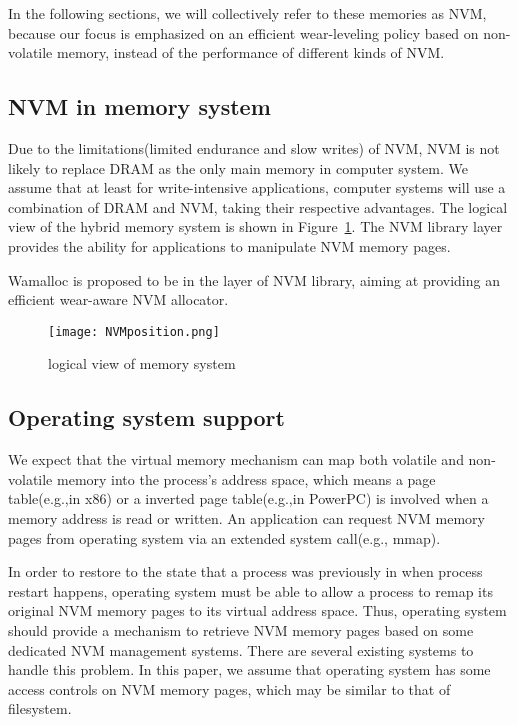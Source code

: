 \documentclass[10pt, conference, compsocconf]{IEEEtran}
\begin{document}
In the following sections, we will collectively refer to these memories as NVM, 
because our focus is emphasized on an efficient wear-leveling policy based on non-volatile memory,
instead of the performance of different kinds of NVM.

\subsection{NVM in memory system}

Due to the limitations(limited endurance and slow writes) of NVM,
NVM is not likely to replace DRAM as the only main memory in computer system.
We assume that at least for write-intensive applications,
computer systems will use a combination of DRAM and NVM, taking their respective advantages.
The logical view of the hybrid memory system is shown in Figure~\ref{fig:NVMposition}.
The NVM library layer provides the ability for applications to manipulate NVM memory pages.

Wamalloc is proposed to be in the layer of NVM library, aiming at providing an efficient wear-aware NVM allocator.

\begin{figure}[h]
\centering
\texttt{[image: NVMposition.png]}
\caption{logical view of memory system}
\label{fig:NVMposition}
\end{figure}

\subsection{Operating system support}

We expect that the virtual memory mechanism can map both volatile and non-volatile memory into the process's address space,
which means a page table(e.g.,in x86) or a inverted page table(e.g.,in PowerPC) is involved when a memory address is read or written.
An application can request NVM memory pages from operating system via an extended system call(e.g., mmap).

In order to restore to the state that a process was previously in when process restart happens, 
operating system must be able to allow a process to remap its original NVM memory pages to its virtual address space.
Thus, operating system should provide a mechanism to retrieve NVM memory pages based on some dedicated NVM management systems.
There are several existing systems to handle this problem\cite{coburn2011nv, satyanarayanan1994lightweight, volos2011mnemosyne}.
In this paper, we assume that operating system has some access controls on NVM memory pages, 
which may be similar to that of filesystem.
\end{document}

